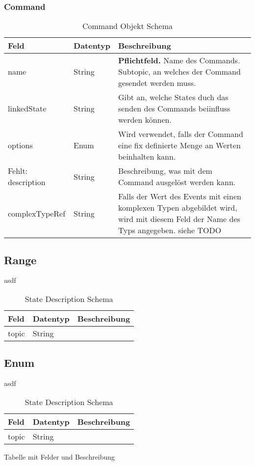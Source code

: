 \subsubsection{Command}
\begin{table}[h!]
\begin{tabularx}{\textwidth}{|l|l|X|}

 \hline
 {\bf Feld } & {\bf Datentyp } & {\bf Beschreibung } \\  \hline
 
 name  &   String   &  \textbf{Pflichtfeld.} Name des Commands. Subtopic, an welches der Command gesendet werden muss. \\ \hline
 linkedState  &   String   &  Gibt an, welche States duch das senden des Commands beiinfluss werden können. \\ \hline
 options  &   Enum   &   Wird verwendet, falls der Command eine fix definierte Menge an Werten beinhalten kann. \\ \hline
 Fehlt: description  &   String   &  Beschreibung, was mit dem Command ausgelöst werden kann.  \\ \hline
 complexTypeRef  &   String   &  Falls der Wert des Events mit einen komplexen Typen abgebildet wird, wird mit diesem Feld der Name des Typs angegeben. siehe TODO  \\ \hline

\end{tabularx}
\caption{Command Objekt Schema}
\end{table}







\subsection{Range}
asdf
\begin{table}[h!]
\begin{tabularx}{\textwidth}{|l|l|X|}

 \hline
 {\bf Feld } & {\bf Datentyp } & {\bf Beschreibung } \\  \hline

 topic  &   String   &    \\ \hline


\end{tabularx}
\caption{State Description Schema}
\end{table}

\subsection{Enum}
asdf
\begin{table}[h!]
\begin{tabularx}{\textwidth}{|l|l|X|}

 \hline
 {\bf Feld } & {\bf Datentyp } & {\bf Beschreibung } \\  \hline

 topic  &   String   &    \\ \hline


\end{tabularx}
\caption{State Description Schema}
\end{table}

Tabelle mit Felder und Beschreibung